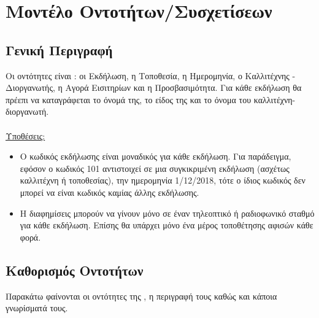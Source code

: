 \section{Μοντέλο Οντοτήτων/Συσχετίσεων}

\subsection{Γενική Περιγραφή}

Οι οντότητες είναι : οι Εκδήλωση, η Τοποθεσία, η Ημερομηνία, ο Καλλιτέχνης - Διοργανωτής, η Αγορά Εισιτηρίων και η Προσβασιμότητα. Για κάθε εκδήλωση θα πρέεπι να καταγράφεται το όνομά της, το είδος της και το όνομα του καλλιτέχνη-διοργανωτή.
\\
\\
\underline{Υποθέσεις:}
\begin{itemize}[noitemsep]

\item Ο κωδικός εκδήλωσης είναι μοναδικός για κάθε εκδήλωση. Για παράδειγμα, εφόσον ο κωδικός 101 αντιστοιχεί σε μια συγκικριμένη εκδήλωση (ασχέτως καλλιτέχνη ή τοποθεσίας), την ημερομηνία 1/12/2018, τότε ο ίδιος κωδικός δεν μπορεί να είναι κωδικός καμίας άλλης εκδήλωσης.
\item Η διαφημίσεις μπορούν να γίνουν μόνο σε έναν τηλεοπτικό ή ραδιοφωνικό σταθμό για κάθε εκδήλωση. Επίσης θα υπάρχει μόνο ένα μέρος τοποθέτησης αφισών κάθε φορά.


\end{itemize}

\subsection{Καθορισμός Οντοτήτων}

Παρακάτω φαίνονται οι οντότητες της \titlos, η περιγραφή τους καθώς και κάποια γνωρίσματά τους.

